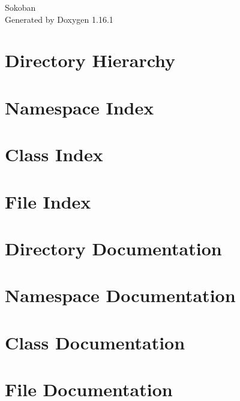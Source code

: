 \documentclass[twoside]{book}
\newcommand{\+}{\discretionary{\mbox{\scriptsize$\hookleftarrow$}}{}{}}
\newcommand{\clearemptydoublepage}{%
    \newpage{\pagestyle{empty}\cleardoublepage}%
  }
\begin{document}
  \raggedbottom
    \hypersetup{pageanchor=false,
                bookmarksnumbered=true,
                pdfencoding=unicode
               }
  \begin{titlepage}
  \vspace*{7cm}
  \begin{center}%
  {\Large Sokoban}\\
  \vspace*{1cm}
  {\large Generated by Doxygen 1.16.1}\\
  \end{center}
  \end{titlepage}
  \clearemptydoublepage
  \tableofcontents
  \clearemptydoublepage
  \hypersetup{pageanchor=true}
\chapter{Directory Hierarchy}

\chapter{Namespace Index}

\chapter{Class Index}

\chapter{File Index}

\chapter{Directory Documentation}



\chapter{Namespace Documentation}


\chapter{Class Documentation}


\chapter{File Documentation}






  \backmatter
  \newpage
  \clearemptydoublepage
  \printindex
\end{document}
